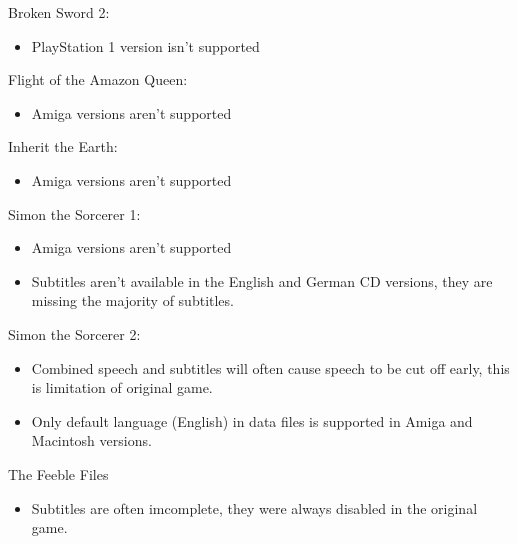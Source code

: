 Broken Sword 2:
  \begin{itemize}
  \item PlayStation 1 version isn't supported
  \end{itemize}
Flight of the Amazon Queen:
  \begin{itemize}
  \item Amiga versions aren't supported
  \end{itemize}
Inherit the Earth:
  \begin{itemize}
  \item Amiga versions aren't supported
  \end{itemize}
Simon the Sorcerer 1:
  \begin{itemize}
  \item Amiga versions aren't supported
  \item Subtitles aren't available in the English and German CD versions,
                 they are missing the majority of subtitles.
  \end{itemize}
Simon the Sorcerer 2:
  \begin{itemize}
  \item Combined speech and subtitles will often cause speech to be
                 cut off early, this is limitation of original game.
  \item Only default language (English) in data files is supported
                 in Amiga and Macintosh versions.
  \end{itemize}
The Feeble Files
  \begin{itemize}
  \item Subtitles are often imcomplete, they were always disabled in the
                 original game.
  \end{itemize}

